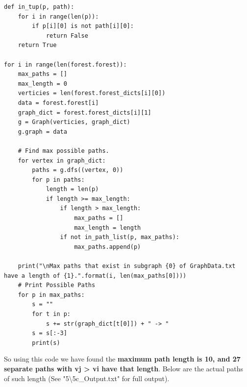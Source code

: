 \documentclass{article}
\begin{document}
\begin{enumerate}
\begin{enumerate}
\begin{lstlisting}
def in_tup(p, path):
    for i in range(len(p)):
        if p[i][0] is not path[i][0]:
            return False
    return True

for i in range(len(forest.forest)):
    max_paths = []
    max_length = 0
    verticies = len(forest.forest_dicts[i][0])
    data = forest.forest[i]
    graph_dict = forest.forest_dicts[i][1]
    g = Graph(verticies, graph_dict)
    g.graph = data
    
    # Find max possible paths.
    for vertex in graph_dict:
        paths = g.dfs((vertex, 0))
        for p in paths:
            length = len(p)
            if length >= max_length:
                if length > max_length:
                    max_paths = []
                    max_length = length                
                if not in_path_list(p, max_paths):
                    max_paths.append(p)
                    
    print("\nMax paths that exist in subgraph {0} of GraphData.txt have a length of {1}.".format(i, len(max_paths[0])))
    # Print Possible Paths
    for p in max_paths:
        s = ""
        for t in p:            
            s += str(graph_dict[t[0]]) + " -> "
        s = s[:-3]
        print(s)          
        \end{lstlisting}

        So using this code we have found the \textbf{maximum path length is 10, and 27 separate paths with vj > vi have that length}. Below are the actual paths of such length (See "5\textbackslash5c\_Output.txt" for full output).


\end{enumerate}
\end{enumerate}
\end{document}

